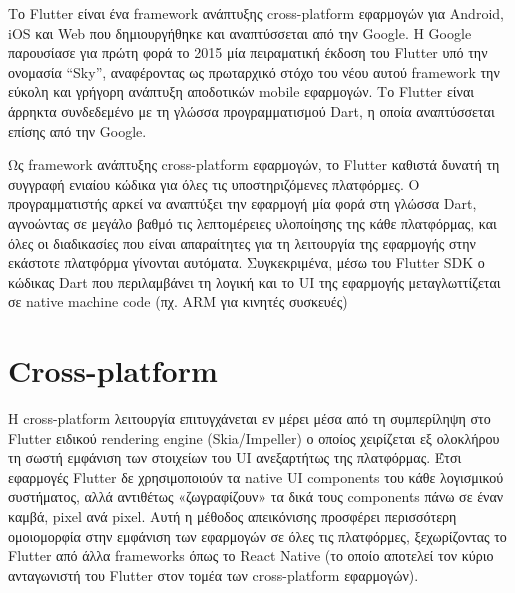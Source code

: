 \documentclass[../thesis.tex]{subfiles}
\begin{document}
Το Flutter είναι ένα framework ανάπτυξης cross-platform εφαρμογών για Android, iOS και Web που δημιουργήθηκε και αναπτύσσεται από την Google.
Η Google παρουσίασε για πρώτη φορά το 2015 μία πειραματική έκδοση του Flutter υπό την ονομασία “Sky”, αναφέροντας ως πρωταρχικό στόχο του νέου αυτού framework την εύκολη και γρήγορη ανάπτυξη αποδοτικών mobile εφαρμογών.
Το Flutter είναι άρρηκτα συνδεδεμένο με τη γλώσσα προγραμματισμού Dart, η οποία αναπτύσσεται επίσης από την Google.

Ως framework ανάπτυξης cross-platform εφαρμογών, το Flutter καθιστά δυνατή τη συγγραφή ενιαίου κώδικα για όλες τις υποστηριζόμενες πλατφόρμες.
Ο προγραμματιστής αρκεί να αναπτύξει την εφαρμογή μία φορά στη γλώσσα Dart,
αγνοώντας σε μεγάλο βαθμό τις λεπτομέρειες υλοποίησης της κάθε πλατφόρμας,
και όλες οι διαδικασίες που είναι απαραίτητες για τη λειτουργία της εφαρμογής στην εκάστοτε πλατφόρμα γίνονται αυτόματα.
Συγκεκριμένα, μέσω του Flutter SDK ο κώδικας Dart που περιλαμβάνει τη λογική και το UI της εφαρμογής μεταγλωττίζεται σε native machine code (πχ. ARM για κινητές συσκευές)

\section{Cross-platform}
Η cross-platform λειτουργία επιτυγχάνεται εν μέρει μέσα από τη συμπερίληψη στο Flutter ειδικού rendering engine (Skia/Impeller) ο οποίος χειρίζεται εξ ολοκλήρου τη σωστή εμφάνιση των στοιχείων του UI ανεξαρτήτως της πλατφόρμας.
Έτσι εφαρμογές Flutter δε χρησιμοποιούν τα native UI components του κάθε λογισμικού συστήματος, αλλά αντιθέτως «ζωγραφίζουν» τα δικά τους components πάνω σε έναν καμβά, pixel ανά pixel.
Αυτή η μέθοδος απεικόνισης προσφέρει περισσότερη ομοιομορφία στην εμφάνιση των εφαρμογών σε όλες τις πλατφόρμες, ξεχωρίζοντας το Flutter από άλλα frameworks όπως το React Native (το οποίο αποτελεί τον κύριο ανταγωνιστή του Flutter στον τομέα των cross-platform εφαρμογών).
\end{document}
